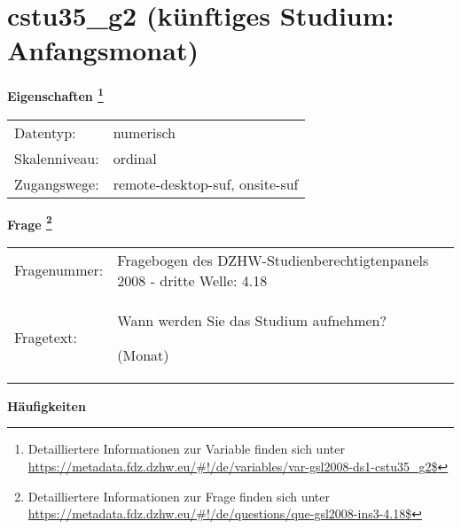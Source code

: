 
    \setcounter{footnote}{0}

    \vspace*{-1.8cm}
	\section{cstu35\_g2 (künftiges Studium: Anfangsmonat)}
	\label{section:cstu35_g2}



    \vspace*{0.5cm}
    \noindent\textbf{Eigenschaften
	\footnote{Detailliertere Informationen zur Variable finden sich unter
		\url{https://metadata.fdz.dzhw.eu/\#!/de/variables/var-gsl2008-ds1-cstu35_g2$}}}\\
	\begin{tabularx}{\hsize}{@{}lX}
	Datentyp: & numerisch \\
	Skalenniveau: & ordinal \\
	Zugangswege: &
	  remote-desktop-suf, 
	  onsite-suf
 \\
    \end{tabularx}



				\vspace*{0.5cm}
                \noindent\textbf{Frage
	                \footnote{Detailliertere Informationen zur Frage finden sich unter
		              \url{https://metadata.fdz.dzhw.eu/\#!/de/questions/que-gsl2008-ins3-4.18$}}}\\
				\begin{tabularx}{\hsize}{@{}lX}
					Fragenummer: &
					  Fragebogen des DZHW-Studienberechtigtenpanels 2008 - dritte Welle:
					  4.18
 \\
					Fragetext: & Wann werden Sie das Studium aufnehmen?\par  (Monat) \\
				\end{tabularx}





        		\vspace*{0.5cm}
                \noindent\textbf{Häufigkeiten}


